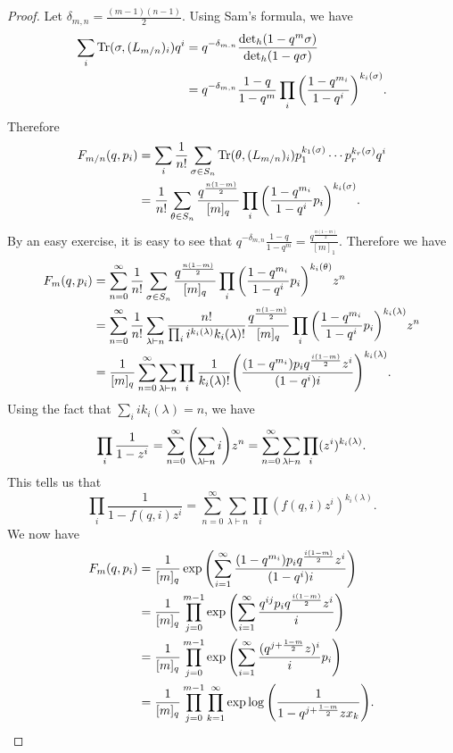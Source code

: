 \documentclass[leqno, openany]{memoir}
\theoremstyle{definition}
\theoremstyle{remark}
\theoremstyle{plain}
\theoremstyle{definition}
\theoremstyle{remark}
\newcommand{\mr}[1]{\mathrm{#1}}
\newcommand{\1}{\mathbf{1}}
\newcommand{\2}{\mathbf{2}}
\newcommand{\3}{\mathbf{3}}
\begin{document}
\begin{proof}
    Let $\delta_{m, n} = \frac{(m-1)(n-1)}{2}$. Using Sam's formula, we have
    \begin{align*}
        \sum_i \mr{Tr}(\sigma, (L_{m/n})_i) q^i &= q^{-\delta_{m.n}} \frac{\det_h (1-q^m \sigma)}{\det_h (1-q \sigma)} \\
        &= q^{-\delta_{m,n}} \frac{1-q}{1-q^m} \prod_i \qty(\frac{1-q^{m_i}}{1-q^i})^{k_i(\sigma)}.
    \end{align*}
    Therefore 
    \begin{align*}
        F_{m/n}(q, p_i) &= \sum_i \frac{1}{n!} \sum_{\sigma \in S_n} \mr{Tr}(\theta, (L_{m/n})_i) p_1^{k_1(\sigma)} \cdots p_r^{k_r(\sigma)} q^i \\
        &= \frac{1}{n!} \sum_{\theta \in S_n} \frac{q^{\frac{n(1-m)}{2}}}{[m]_q} \prod_i \qty(\frac{1-q^{m_i}}{1-q^i} p_i)^{k_i(\sigma)}.
    \end{align*}
    By an easy exercise, it is easy to see that $q^{-\delta_{m,n}} \frac{1-q}{1-q^m} = \frac{q^{\frac{n(1-m)}{2}}}{[m]_1}$. Therefore we have
    \begin{align*}
        F_m(q, p_i) &= \sum_{n=0}^{\infty} \frac{1}{n!} \sum_{\sigma \in S_n} \frac{q^{\frac{n(1-m)}{2}}}{[m]_q} \prod_i \qty(\frac{1-q^{m_i}}{1-q^i} p_i)^{k_i(\theta)} z^n \\
        &= \sum_{n = 0}^{\infty} \frac{1}{n!} \sum_{\lambda \vdash n} \frac{n!}{\prod_i i^{k_i(\lambda)} k_i(\lambda)!} \frac{q^{\frac{n(1-m)}{2}}}{[m]_q} \prod_i \qty(\frac{1-q^{m_i}}{1-q^i} p_i)^{k_i(\lambda)} z^n \\
        &= \frac{1}{[m]_q} \sum_{n=0}^{\infty} \sum_{\lambda \vdash n} \prod_i \frac{1}{k_i(\lambda)!} \qty(\frac{(1-q^{m_i}) p_i q^{\frac{i(1-m)}{2}} z^i}{(1-q^i) i})^{k_i(\lambda)}.
    \end{align*}
    Using the fact that $\sum_i i k_i(\lambda) = n$, we have
    \begin{align*}
        \prod_i \frac{1}{1-z^i} = \sum_{n=0}^{\infty} \qty(\sum_{\lambda \vdash n} i) z^n = \sum_{n=0}^{\infty} \sum_{\lambda \vdash n} \prod_i (z^i)^{k_i(\lambda)}.
    \end{align*}
    This tells us that
    \[ \prod_i \frac{1}{1-f(q, i) z^i} = \sum_{n=0}^{\infty} \sum_{\lambda \vdash n} \prod_i (f(q, i) z^i)^{k_i(\lambda)}. \]
    We now have
    \begin{align*}
        F_m(q, p_i) &= \frac{1}{[m]_q} \exp \qty(\sum_{i=1}^{\infty} \frac{(1-q^{m_i})p_i q^{\frac{i(1-m)}{2}} z^i}{(1-q^i) i}) \\
        &= \frac{1}{[m]_q} \prod_{j=0}^{m-1} \exp \qty(\sum_{i=1}^{\infty} \frac{q^{ij} p_i q^{\frac{i(1-m)}{2}} z^i}{i}) \\
        &= \frac{1}{[m]_q} \prod_{j=0}^{m-1} \exp\qty(\sum_{i=1}^{\infty} \frac{(q^{j + \frac{1-m}{2}} z)^i}{i} p_i) \\
        &= \frac{1}{[m]_q} \prod_{j=0}^{m-1} \prod_{k=1}^{\infty} \exp \log \qty(\frac{1}{1-q^{j + \frac{1-m}{2}} z x_k}). \qedhere
    \end{align*}
\end{proof}
\end{document}
